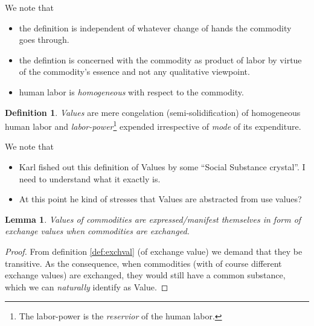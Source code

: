 \documentclass[12pt]{extarticle}
\newtheorem{lemma}[theorem]{Lemma}
\theoremstyle{definition}
\newtheorem{definition}{Definition}[section]
\newenvironment{remark}[1][Remark]{\begin{trivlist}
\item[\hskip \labelsep {\bfseries #1}]}{\end{trivlist}}
\begin{document}
        \begin{remark}
        We note that
        \begin{itemize}
        \item the definition is independent of whatever change of hands the commodity goes through.
        \item the defintion is concerned with the commodity as product of labor by virtue of the commodity's essence and not any qualitative viewpoint.
        \item human labor is \emph{homogeneous} with respect to the commodity.
        \end{itemize}
      \end{remark}

      \begin{definition}
        \label{def:values}
        \emph{Values} are mere congelation (semi-solidification) of homogeneous human labor and \emph{labor-power}\footnote{The labor-power is the \emph{reservior} of the human labor.} expended irrespective of \emph{mode} of its expenditure.
      \end{definition}

      \begin{remark}
        We note that
        \begin{itemize}
        \item Karl fished out this definition of Values by some ``Social Substance crystal''.  I need to understand what it exactly is.
          \item At this point he kind of stresses that Values are abstracted from use values?
        \end{itemize}
      \end{remark}

      \begin{lemma}
        Values of commodities are expressed/manifest themselves in form of exchange values when commodities are exchanged.
      \end{lemma}

      \begin{proof}
        From definition \ref{def:exchval} (of exchange value) we demand that they be transitive.  As the consequence, when commodities (with of course different exchange values) are exchanged, they would still have a common substance, which we can \emph{naturally} identify as Value. 
      \end{proof}
\end{document}
